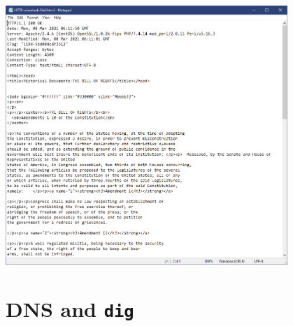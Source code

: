 \documentclass[11pt]{article}
\begin{document}
\begin{center}
  \item \includegraphics[width=0.8\textwidth]{img/cached_website_html_code.PNG}
\end{center}

\break
\section{DNS and \texttt{dig}}
\end{document}

